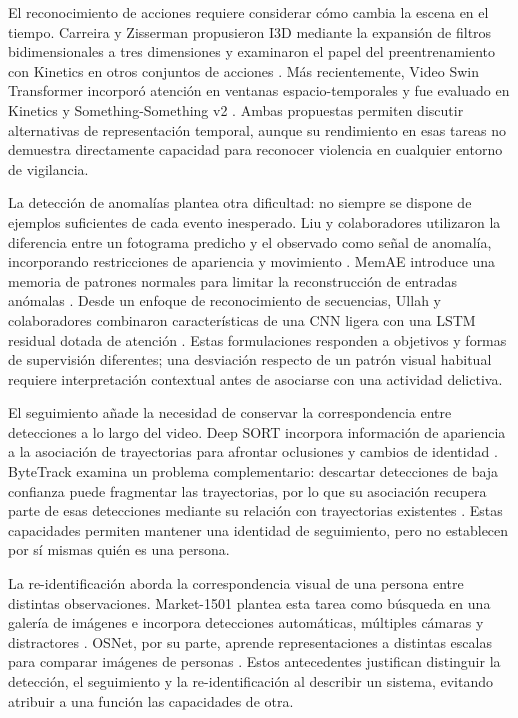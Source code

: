 \documentclass[pdflatex,sn-mathphys-num]{sn-jnl}%
\theoremstyle{thmstyleone}%
\theoremstyle{thmstyletwo}%
\theoremstyle{thmstylethree}%
\begin{document}
El reconocimiento de acciones requiere considerar cómo cambia la escena en el tiempo. Carreira y Zisserman propusieron I3D mediante la expansión de filtros bidimensionales a tres dimensiones y examinaron el papel del preentrenamiento con Kinetics en otros conjuntos de acciones \cite{carreira2017}. Más recientemente, Video Swin Transformer incorporó atención en ventanas espacio-temporales y fue evaluado en Kinetics y Something-Something v2 \cite{liuswin2022}. Ambas propuestas permiten discutir alternativas de representación temporal, aunque su rendimiento en esas tareas no demuestra directamente capacidad para reconocer violencia en cualquier entorno de vigilancia.

La detección de anomalías plantea otra dificultad: no siempre se dispone de ejemplos suficientes de cada evento inesperado. Liu y colaboradores utilizaron la diferencia entre un fotograma predicho y el observado como señal de anomalía, incorporando restricciones de apariencia y movimiento \cite{liu2018}. MemAE introduce una memoria de patrones normales para limitar la reconstrucción de entradas anómalas \cite{gong2019}. Desde un enfoque de reconocimiento de secuencias, Ullah y colaboradores combinaron características de una CNN ligera con una LSTM residual dotada de atención \cite{ullah2021}. Estas formulaciones responden a objetivos y formas de supervisión diferentes; una desviación respecto de un patrón visual habitual requiere interpretación contextual antes de asociarse con una actividad delictiva.

El seguimiento añade la necesidad de conservar la correspondencia entre detecciones a lo largo del video. Deep SORT incorpora información de apariencia a la asociación de trayectorias para afrontar oclusiones y cambios de identidad \cite{wojke2017}. ByteTrack examina un problema complementario: descartar detecciones de baja confianza puede fragmentar las trayectorias, por lo que su asociación recupera parte de esas detecciones mediante su relación con trayectorias existentes \cite{zhang2022}. Estas capacidades permiten mantener una identidad de seguimiento, pero no establecen por sí mismas quién es una persona.

La re-identificación aborda la correspondencia visual de una persona entre distintas observaciones. Market-1501 plantea esta tarea como búsqueda en una galería de imágenes e incorpora detecciones automáticas, múltiples cámaras y distractores \cite{zheng2015}. OSNet, por su parte, aprende representaciones a distintas escalas para comparar imágenes de personas \cite{zhou2019}. Estos antecedentes justifican distinguir la detección, el seguimiento y la re-identificación al describir un sistema, evitando atribuir a una función las capacidades de otra.
\end{document}
